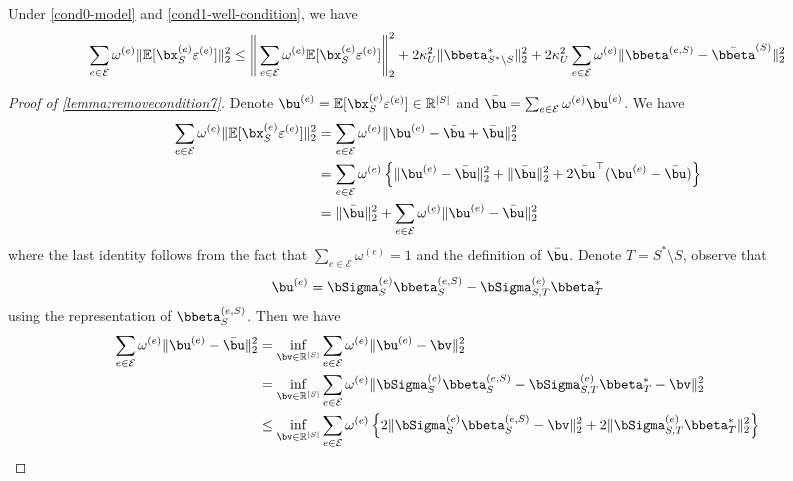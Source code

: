 \documentclass[10pt]{article}
\numberwithin{equation}{section}
\begin{document}
\iffalse
\begin{lemma}
\label{lemma:removecondition7}
Under \cref{cond0-model} and \ref{cond1-well-condition}, we have
\begin{align*}
    \sum_{e\in \mathcal{E}} \omega^{(e)} \|\mathbb{E}[\bx_S^{(e)} \varepsilon^{(e)}] \|_2^2 \le \Bigg\|\sum_{e\in \mathcal{E}} \omega^{(e)} \mathbb{E}[\bx_S^{(e)} \varepsilon^{(e)}] \Bigg\|_2^2 + 2\kappa_U^2\|\bbeta_{S^*\setminus S}^*\|_2^2 + 2\kappa_U^2 \sum_{e\in \mathcal{E}} \omega^{(e)} \|\bbeta^{(e,S)} - \bar{\bbeta}^{(S)}\|_2^2
\end{align*}
\end{lemma}
\begin{proof}[Proof of \cref{lemma:removecondition7}]
Denote $\bu^{(e)} = \mathbb{E}[\bx_S^{(e)} \varepsilon^{(e)}] \in \mathbb{R}^{|S|}$ and $\bar{\bu} = \sum_{e\in \mathcal{E}} \omega^{(e)} \bu^{(e)}$. We have
\begin{align*}
    \sum_{e\in \mathcal{E}} \omega^{(e)} \|\mathbb{E}[\bx_S^{(e)} \varepsilon^{(e)}] \|_2^2 &= \sum_{e\in \mathcal{E}} \omega^{(e)} \|\bu^{(e)}-\bar{\bu} + \bar{\bu}\|_2^2 \\
    &= \sum_{e\in \mathcal{E}} \omega^{(e)} \left\{\|\bu^{(e)} - \bar{\bu}\|_2^2 + \|\bar{\bu}\|_2^2 + 2\bar{\bu}^\top (\bu^{(e)} - \bar{\bu})\right\} \\
    &= \|\bar{\bu}\|_2^2 + \sum_{e\in \mathcal{E}} \omega^{(e)} \|\bu^{(e)} - \bar{\bu}\|_2^2
\end{align*} where the last identity follows from the fact that $\sum_{e\in \mathcal{E}} \omega^{(e)}=1$ and the definition of $\bar{\bu}$. Denote $T = S^* \setminus S$, observe that 
\begin{align*}
    \bu^{(e)} = \bSigma^{(e)}_S \bbeta_S^{(e,S)} - \bSigma_{S,T}^{(e)} \bbeta_T^*
\end{align*} using the representation of $\bbeta_S^{(e,S)}$. Then we have
\begin{align*}
    \sum_{e\in \mathcal{E}} \omega^{(e)} \|\bu^{(e)} - \bar{\bu}\|_2^2 &= \inf_{\bv \in \mathbb{R}^{|S|}} \sum_{e\in \mathcal{E}} \omega^{(e)} \|\bu^{(e)} - \bv\|_2^2 \\
    &= \inf_{\bv \in \mathbb{R}^{|S|}} \sum_{e\in \mathcal{E}} \omega^{(e)} \|\bSigma^{(e)}_S \bbeta_S^{(e,S)} - \bSigma_{S,T}^{(e)} \bbeta_T^* - \bv\|_2^2 \\
    &\le \inf_{\bv \in \mathbb{R}^{|S|}} \sum_{e\in \mathcal{E}} \omega^{(e)} \left\{2\|\bSigma^{(e)}_S \bbeta_S^{(e,S)} - \bv\|_2^2 + 2\|\bSigma_{S,T}^{(e)} \bbeta_T^* \|_2^2\right\} \\

\end{align*}
\end{proof}
\end{document}
